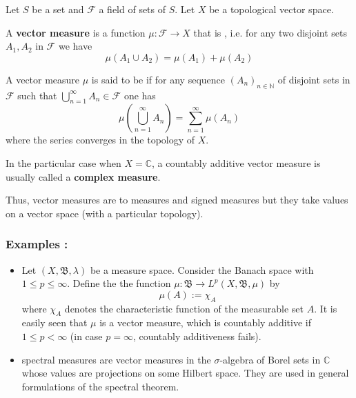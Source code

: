 \documentclass[12pt]{article}
\begin{document}
Let $S$ be a set and $\mathcal{F}$ a field of sets of $S$. Let $X$ be a topological vector space.

A {\bf vector measure} is a function $\mu : \mathcal{F} \longrightarrow X$ that is , i.e. for any two disjoint sets $A_1, A_2$ in $\mathcal{F}$ we have
\begin{displaymath}
\mu(A_1 \cup A_2) = \mu(A_1)+\mu(A_2)
\end{displaymath}

A vector measure $\mu$ is said to be {\bf {}} if for any sequence $(A_n)_{n \in \mathbb{N}}$ of disjoint sets in $\mathcal{F}$ such that $\displaystyle \bigcup_{n =1}^{\infty}A_n \in \mathcal{F}$ one has
\begin{displaymath}
\mu(\bigcup_{n =1}^{\infty}A_n) = \sum_{n=1}^{\infty} \mu(A_n)
\end{displaymath}
where the series converges in the topology of $X$.

In the particular case when $X = \mathbb{C}$, a countably additive vector measure is usually called a {\bf complex measure}.

Thus, vector measures are  to measures and signed measures but they take values on a vector space (with a particular topology).

\subsubsection{Examples :}
\begin{itemize}
\item Let $(X, \mathfrak{B}, \lambda)$ be a measure space. Consider the Banach space  with $1 \leq p \leq \infty$. Define the the function $\mu : \mathfrak{B} \longrightarrow L^p(X, \mathfrak{B}, \mu)$ by
\begin{displaymath}
\mu(A) := \chi_A
\end{displaymath}
where $\chi_A$ denotes the characteristic function of the measurable set $A$. It is easily seen that $\mu$ is a vector measure, which is countably additive if $1 \leq p < \infty$ (in case $p = \infty$, countably additiveness fails).
\end{itemize}
\begin{itemize}
\item spectral measures are vector measures in the $\sigma$-algebra of Borel sets in $\mathbb{C}$ whose values are projections on some Hilbert space. They are used in general formulations of the spectral theorem.
\end{itemize}
\end{document}
